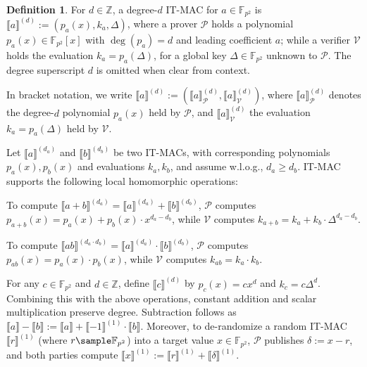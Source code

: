 \documentclass[11pt,a4paper]{article}
\theoremstyle{definition}
\newtheorem{definition}[theorem]{Definition}
\theoremstyle{remark}
\newcommand{\F}{\mathbb{F}}
\newcommand{\Z}{\mathbb{Z}}
\newcommand{\itmac}[1]{\llbracket {#1} \rrbracket}
\newcommand{\itmacP}[1]{\llbracket {#1} \rrbracket_{\calP}}
\newcommand{\itmacV}[1]{\llbracket {#1} \rrbracket_{\calV}}
\newcommand{\calP}{\mathcal{P}}
\newcommand{\calV}{\mathcal{V}}
\begin{document}
\begin{definition}\label{def:it-mac}
	For $d \in \Z$, a degree-$d$ IT-MAC for $a \in \F_{p^2}$ is
	$\itmac{a}^{(d)} := (p_a(x), k_a, \Delta)$,
	where a prover $\calP$ holds a polynomial ${p}_{a}(x) \in \F_{p^2}[x]$
	with $\deg(p_a) = d$ and leading coefficient $a$;
	while a verifier $\calV$ holds the evaluation
	${k}_a = {p}_{a}(\Delta)$, for a global key
	$\Delta \in \F_{p^2}$ unknown to $\calP$.
	The degree superscript $d$ is omitted when clear from context.
\end{definition}

In bracket notation, we write
$\itmac{a}^{(d)} := (\itmacP{a}^{(d)}, \itmacV{a}^{(d)})$,
where $\itmacP{a}^{(d)}$ denotes the degree-$d$ polynomial $p_a(x)$
held by $\calP$, and $\itmacV{a}^{(d)}$ the evaluation
$k_a = p_a(\Delta)$ held by $\calV$.

Let $\itmac{a}^{(d_a)}$ and $\itmac{b}^{(d_b)}$ be two IT-MACs,
with corresponding polynomials $p_a(x), p_b(x)$ and evaluations $k_a, k_b$,
and assume w.l.o.g., $d_a \geq d_b$.
IT-MAC supports the following local homomorphic operations:
\begin{description}[leftmargin=0.9em, labelsep=0.5em]
	\item[Addition.] To compute $\itmac{a + b}^{(d_a)} = \itmac{a}^{(d_a)} + \itmac{b}^{(d_b)}$,
		$\calP$ computes $p_{a+b}(x) = p_a(x) + p_b(x) \cdot x^{d_a - d_b}$,
		while $\calV$ computes $k_{a+b} = k_a + k_b \cdot \Delta^{d_a - d_b}$.

	\item[Multiplication.] To compute $\itmac{ab}^{(d_a \cdot d_b)} = \itmac{a}^{(d_a)} \cdot \itmac{b}^{(d_b)}$,
		$\calP$ computes $p_{ab}(x) = p_a(x) \cdot p_b(x)$,
		while $\calV$ computes $k_{ab} = k_a \cdot k_b$.

	\item[Constants.] For any $c \in \F_{p^2}$ and $d \in \Z$,
		define $\itmac{c}^{(d)}$ by $p_c(x) = c x^d$ and $k_c = c \Delta^d$.
		Combining this with the above operations, constant addition and
		scalar multiplication preserve degree.
		Subtraction follows as $\itmac{a} - \itmac{b} := \itmac{a} + \itmac{-1}^{(1)} \cdot \itmac{b}$.
		Moreover, to de-randomize a random IT-MAC $\itmac{r}^{(1)}$
		(where $r \sample \F_{p^2}$) into a target value $x \in \F_{p^2}$,
		$\calP$ publishes $\delta := x - r$, and both parties compute
		$\itmac{x}^{(1)} := \itmac{r}^{(1)} + \itmac{\delta}^{(1)}$.
\end{description}
\end{document}
